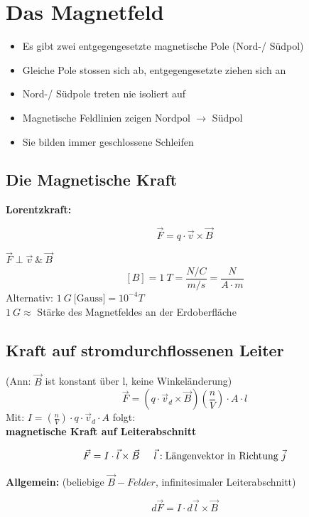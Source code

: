 \section{Das Magnetfeld}

\begin{itemize}
	\item Es gibt zwei entgegengesetzte magnetische Pole (Nord-/ Südpol)
	\item Gleiche Pole stossen sich ab, entgegengesetzte ziehen sich an
	\item Nord-/ Südpole treten nie isoliert auf
	\item Magnetische Feldlinien zeigen Nordpol $\rightarrow$ Südpol
	\item Sie bilden immer geschlossene Schleifen
\end{itemize}

\subsection{Die Magnetische Kraft}
\textbf{Lorentzkraft:}
\begin{formulabox}
    \[
        \Vec{F} = q \cdot \Vec{v} \times \Vec{B}
    \]
\end{formulabox}
$\Vec{F} \perp \Vec{v} \ \& \ \Vec{B}$
\[
    [B] = 1 \ T = \frac{N/C}{m/s} = \frac{N}{A \cdot m}
\]
\hspace{5mm} Alternativ: $1 \ G \ \text{[Gauss]} = 10^{-4}T$ \\[1ex]
\hspace{5mm} $1 \ G \approx$ Stärke des Magnetfeldes an der Erdoberfläche

\subsection{Kraft auf stromdurchflossenen Leiter}
(Ann: $\Vec{B}$ ist konstant über l, keine Winkeländerung)
\[
    \Vec{F} = \left( q \cdot \Vec{v}_d \times \Vec{B} \right) \left( \frac{n}{V} \right) \cdot A \cdot l
\]
\hspace{5mm} Mit: $I = \left( \frac{n}{V} \right) \cdot q \cdot \Vec{v}_d \cdot A$ folgt: \\[1ex]
\textbf{magnetische Kraft auf Leiterabschnitt}
\begin{formulabox}
    \[
        \Vec{F} = I \cdot \Vec{l} \times \Vec{B} \hspace{5mm} \Vec{l}: \text{Längenvektor in Richtung } \Vec{j}
    \]  
\end{formulabox}
\textbf{Allgemein:} (beliebige $\Vec{B}-Felder$, infinitesimaler Leiterabschnitt) 
\begin{formulabox}
    \[
        d\Vec{F} = I \cdot d\Vec{l} \times \Vec{B}
    \]
\end{formulabox}

